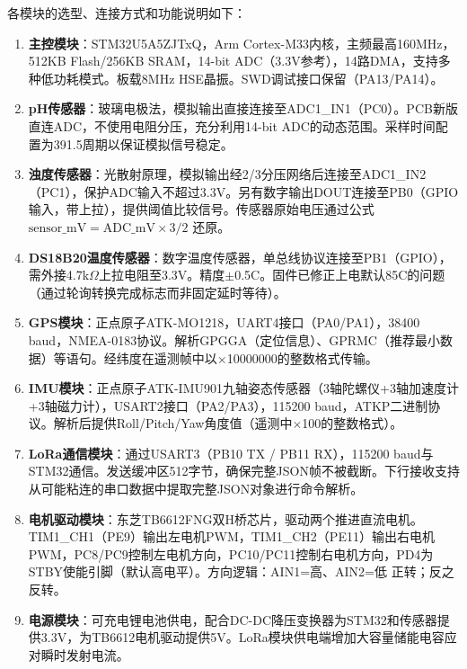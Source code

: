 \documentclass[12pt,a4paper]{ctexart}
\begin{document}
各模块的选型、连接方式和功能说明如下：

\begin{enumerate}[label=\arabic*.]
    \item \textbf{主控模块}：STM32U5A5ZJTxQ，Arm Cortex-M33内核，主频最高160MHz，512KB Flash/256KB SRAM，14-bit ADC（3.3V参考），14路DMA，支持多种低功耗模式。板载8MHz HSE晶振。SWD调试接口保留（PA13/PA14）。

    \item \textbf{pH传感器}：玻璃电极法，模拟输出直接连接至ADC1\_IN1（PC0）。PCB新版直连ADC，不使用电阻分压，充分利用14-bit ADC的动态范围。采样时间配置为391.5周期以保证模拟信号稳定。

    \item \textbf{浊度传感器}：光散射原理，模拟输出经2/3分压网络后连接至ADC1\_IN2（PC1），保护ADC输入不超过3.3V。另有数字输出DOUT连接至PB0（GPIO输入，带上拉），提供阈值比较信号。传感器原始电压通过公式 $\text{sensor\_mV} = \text{ADC\_mV} \times 3/2$ 还原。

    \item \textbf{DS18B20温度传感器}：数字温度传感器，单总线协议连接至PB1（GPIO），需外接4.7k$\Omega$上拉电阻至3.3V。精度$\pm$0.5\textdegree C。固件已修正上电默认85\textdegree C的问题（通过轮询转换完成标志而非固定延时等待）。

    \item \textbf{GPS模块}：正点原子ATK-MO1218，UART4接口（PA0/PA1），38400 baud，NMEA-0183协议。解析GPGGA（定位信息）、GPRMC（推荐最小数据）等语句。经纬度在遥测帧中以$\times$10000000的整数格式传输。

    \item \textbf{IMU模块}：正点原子ATK-IMU901九轴姿态传感器（3轴陀螺仪+3轴加速度计+3轴磁力计），USART2接口（PA2/PA3），115200 baud，ATKP二进制协议。解析后提供Roll/Pitch/Yaw角度值（遥测中$\times$100的整数格式）。

    \item \textbf{LoRa通信模块}：通过USART3（PB10 TX / PB11 RX），115200 baud与STM32通信。发送缓冲区512字节，确保完整JSON帧不被截断。下行接收支持从可能粘连的串口数据中提取完整JSON对象进行命令解析。

    \item \textbf{电机驱动模块}：东芝TB6612FNG双H桥芯片，驱动两个推进直流电机。TIM1\_CH1（PE9）输出左电机PWM，TIM1\_CH2（PE11）输出右电机PWM，PC8/PC9控制左电机方向，PC10/PC11控制右电机方向，PD4为STBY使能引脚（默认高电平）。方向逻辑：AIN1=高、AIN2=低 正转；反之反转。

    \item \textbf{电源模块}：可充电锂电池供电，配合DC-DC降压变换器为STM32和传感器提供3.3V，为TB6612电机驱动提供5V。LoRa模块供电端增加大容量储能电容应对瞬时发射电流。
\end{enumerate}
\end{document}
